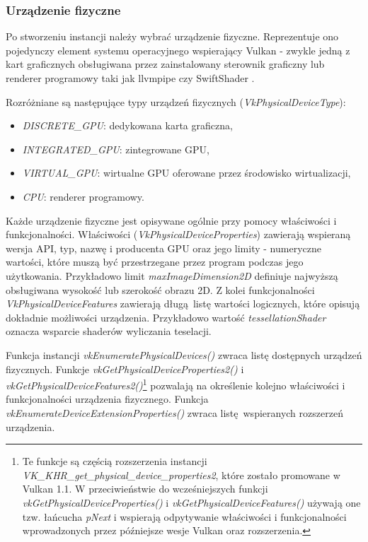\subsubsection{Urządzenie fizyczne}

Po stworzeniu instancji należy wybrać urządzenie fizyczne. Reprezentuje ono pojedynczy element systemu operacyjnego wspierający Vulkan - zwykle jedną z kart graficznych obsługiwana przez zainstalowany sterownik graficzny lub renderer programowy taki jak llvmpipe \cite{LLVMPIPE} czy SwiftShader \cite{SWIFTSHADER}.

Rozróżniane są następujące typy urządzeń fizycznych (\textit{VkPhysicalDeviceType}):
\begin{itemize}
	\item \textit{DISCRETE\_GPU}: dedykowana karta graficzna,
	\item \textit{INTEGRATED\_GPU}: zintegrowane GPU,
	\item \textit{VIRTUAL\_GPU}: wirtualne GPU oferowane przez środowisko wirtualizacji,
	\item \textit{CPU}: renderer programowy.
\end{itemize}

Każde urządzenie fizyczne jest opisywane ogólnie przy pomocy właściwości i funkcjonalności.
Właściwości (\textit{VkPhysicalDeviceProperties}) zawierają wspieraną wersja API, typ, nazwę i producenta GPU oraz jego limity - numeryczne wartości, które muszą być przestrzegane przez program podczas jego użytkowania. Przykładowo limit \textit{maxImageDimension2D} definiuje najwyższą obsługiwana wysokość lub szerokość obrazu 2D.
Z kolei funkcjonalności \textit{VkPhysicalDeviceFeatures} zawierają długą listę wartości logicznych, które opisują dokładnie możliwości urządzenia. Przykładowo wartość \textit{tessellationShader} oznacza wsparcie shaderów wyliczania teselacji.

Funkcja instancji \textit{vkEnumeratePhysicalDevices()} zwraca listę dostępnych urządzeń fizycznych.
Funkcje \textit{vkGetPhysicalDeviceProperties2()} i \textit{vkGetPhysicalDeviceFeatures2()}\footnote{Te funkcje są częścią rozszerzenia instancji \textit{VK\_KHR\_get\_physical\_device\_properties2}, które zostało promowane w Vulkan 1.1. W przeciwieństwie do wcześniejszych funkcji \textit{vkGetPhysicalDeviceProperties()} i \textit{vkGetPhysicalDeviceFeatures()} używają one tzw. łańcucha \textit{pNext} i wspierają odpytywanie właściwości i funkcjonalności wprowadzonych przez późniejsze wesje Vulkan oraz rozszerzenia.} pozwalają na określenie kolejno właściwości i funkcjonalności urządzenia fizycznego.
Funkcja \textit{vkEnumerateDeviceExtensionProperties()} zwraca listę wspieranych rozszerzeń urządzenia.

